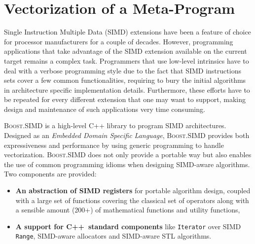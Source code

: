 \documentclass[10pt]{sigplanconf}
\providecommand{\boostsimd}{\textsc{Boost.SIMD}}
\providecommand{\cpp}[1][~]{\textsc{C++}#1}
\begin{document}
\section{Vectorization of a Meta-Program}
\label{sec:meta-vectorization}

Single Instruction Multiple Data (SIMD) extensions have been a feature of
choice for processor manufacturers for a couple of decades. However,
programming applications that take advantage of the SIMD extension available on
the current target remains a complex task. Programmers that use low-level
intrinsics have to deal with a verbose programming style due to the fact that
SIMD instructions sets cover a few common functionalities, requiring to bury
the initial algorithms in architecture specific implementation details.
Furthermore, these efforts have to be repeated for every different extension
that one may want to support, making design and maintenance of such
applications very time consuming. 

\boostsimd{} is a high-level C++ library to program SIMD architectures. 
Designed as an \textit{Embedded Domain Specific Language}, \boostsimd{} 
provides both expressiveness and performance by using generic programming 
to handle vectorization. \boostsimd{} does not only provide a portable 
way but also enables the use of common programming idioms when designing 
SIMD-aware algorithms. Two components are provided:

\begin{itemize}
\item \textbf{An abstraction of SIMD registers} for portable algorithm design,
coupled with a large set of functions covering the classical set of operators
along with a sensible amount (200+) of mathematical functions and utility functions,
\item \textbf{A support for \cpp standard components} like \texttt{Iterator}
over SIMD \texttt{Range}, SIMD-aware allocators and SIMD-aware STL algorithms.
\end{itemize}
\end{document}
